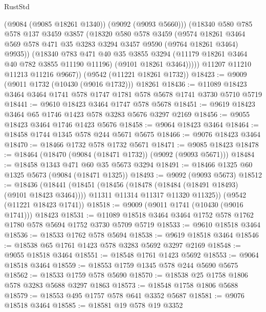 \begin{lexlean}{RustStd}
\begin{coremodule}
              (@9084 (@9085 @18261 @1340))
              (@9092 (@9093 @5660)))
            (@18340
              @580
              @785
              @578
              @137
              @3459
              @3857
              (@18320
                @580
                @578
                @3459
                (@9574
                  @18261
                  @3464
                  @569
                  @578
                  @471
                  @35
                  @3283
                  @3294
                  @3457
                  @9590
                  (@9764 @18261 @3464)
                  @9935))
              (@18340
                @783
                @471
                @40
                @35
                @3855
                @3294
                (@11179 @18261 @3464 @40 @782 @3855 @11190 @11196)
                (@9101 @18261 @3464)))))
        @11207
        @11210
        @11213
        @11216
        @9667))
    (@9542 (@11221 @18261 @1732))
@18423 := @9009 (@9011 @1732 (@10430 (@9016 @1732))) @18261
@18436 := @11089 @18423 @3464 @3464 @1741 @578 @1747 @1781 @578 @5678 @1741 @3730 @5710 @5719
@18441 := @9610 @18423 @3464 @1747 @578 @5678
@18451 := @9619 @18423 @3464 @65 @1746 @1423 @578 @3283 @5676 @3297 @2169
@18456 := @9055 @18423 @3464 @1746 @1423 @5676
@18458 := @9064 @18423 @3464
@18464 := @18458 @1744 @1345 @578 @244 @5671 @5675
@18466 := @9076 @18423 @3464
@18470 := @18466 @1732 @578 @1732 @5671
@18471 := @9085 @18423
@18478 := @18464 (@18470 (@9084 (@18471 @1732)) (@9092 (@9093 @5671)))
@18484 := @18458 @1343 @471 @60 @35 @5673 @3294
@18491 := @18466 @1325 @60 @1325 @5673 (@9084 (@18471 @1325))
@18493 := @9092 (@9093 @5673)
@18512 := @18436
    (@18441
      (@18451
        (@18456 (@18478 (@18484 (@18491 @18493) (@9101 @18423 @3464))))
        @11311
        @11314
        @11317
        @11320
        @11325))
    (@9542 (@11221 @18423 @1741))
@18518 := @9009 (@9011 @1741 (@10430 (@9016 @1741))) @18423
@18531 := @11089 @18518 @3464 @3464 @1752 @578 @1762 @1780 @578 @5694 @1752 @3730 @5709 @5719
@18533 := @9610 @18518 @3464
@18536 := @18533 @1762 @578 @5694
@18538 := @9619 @18518 @3464
@18546 := @18538 @65 @1761 @1423 @578 @3283 @5692 @3297 @2169
@18548 := @9055 @18518 @3464
@18551 := @18548 @1761 @1423 @5692
@18553 := @9064 @18518 @3464
@18559 := @18553 @1759 @1345 @578 @244 @5690 @5675
@18562 := @18533 @1759 @578 @5690
@18570 := @18538 @25 @1758 @1806 @578 @3283 @5688 @3297 @1863
@18573 := @18548 @1758 @1806 @5688
@18579 := @18553 @495 @1757 @578 @641 @3352 @5687
@18581 := @9076 @18518 @3464
@18585 := @18581 @19 @578 @19 @3352

\end{coremodule}
\end{lexlean}
